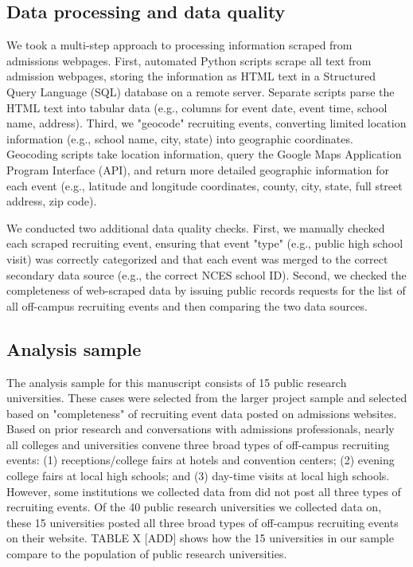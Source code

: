 \documentclass[twoside]{article}
\begin{document}
\subsection*{Data processing and data quality}

We took a multi-step approach to processing information scraped from admissions webpages. First, automated Python scripts scrape all text from admission webpages, storing the information as HTML text in a Structured Query Language (SQL) database on a remote server. Separate scripts parse the HTML text into tabular data (e.g., columns for event date, event time, school name, address). Third, we "geocode" recruiting events, converting limited location information (e.g., school name, city, state) into geographic coordinates. Geocoding scripts take location information, query the Google Maps Application Program Interface (API), and return more detailed geographic information for each event (e.g., latitude and longitude coordinates, county, city, state, full street address, zip code).

We conducted two additional data quality checks. First, we manually checked each scraped recruiting event, ensuring that event "type" (e.g., public high school visit) was correctly categorized and that each event was merged to the correct secondary data source (e.g., the correct NCES school ID). Second, we checked the completeness of web-scraped data by issuing public records requests for the list of all off-campus recruiting events and then comparing the two data sources.

\subsection*{Analysis sample}

The analysis sample for this manuscript consists of 15 public research universities. These cases were selected from the larger project sample and selected based on "completeness" of recruiting event data posted on admissions websites.  Based on prior research and conversations with admissions professionals, nearly all colleges and universities convene three broad types of off-campus recruiting events: (1) receptions/college fairs at hotels and convention centers; (2) evening college fairs at local high schools; and (3) day-time visits at local high schools. However, some institutions we collected data from did not post all three types of recruiting events. Of the 40 public research universities we collected data on, these 15 universities posted all three broad types of off-campus recruiting events on their website. TABLE X [ADD] shows how the 15 universities in our sample compare to the population of public research universities.
\end{document}
